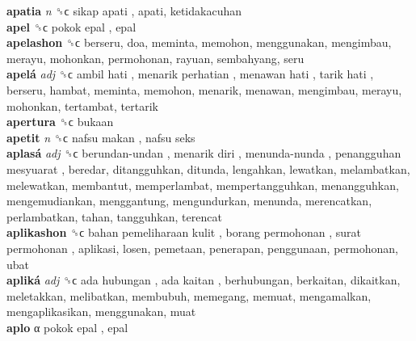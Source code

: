 \textbf{apatia} \emph{n}  ␝ϲ   sikap apati , apati, ketidakacuhan  \\
\textbf{apel} ␝ϲ   pokok epal , epal  \\
\textbf{apelashon} ␝ϲ  berseru, doa, meminta, memohon, menggunakan, mengimbau, merayu, mohonkan, permohonan, rayuan, sembahyang, seru  \\
\textbf{apelá} \emph{adj}  ␝ϲ   ambil hati ,  menarik perhatian ,  menawan hati ,  tarik hati , berseru, hambat, meminta, memohon, menarik, menawan, mengimbau, merayu, mohonkan, tertambat, tertarik  \\
\textbf{apertura} ␝ϲ  bukaan  \\
\textbf{apetit} \emph{n}  ␝ϲ   nafsu makan ,  nafsu seks   \\
\textbf{aplasá} \emph{adj}  ␝ϲ   berundan-undan ,  menarik diri ,  menunda-nunda ,  penangguhan mesyuarat , beredar, ditangguhkan, ditunda, lengahkan, lewatkan, melambatkan, melewatkan, membantut, memperlambat, mempertangguhkan, menangguhkan, mengemudiankan, menggantung, mengundurkan, menunda, merencatkan, perlambatkan, tahan, tangguhkan, terencat  \\
\textbf{aplikashon} ␝ϲ   bahan pemeliharaan kulit ,  borang permohonan ,  surat permohonan , aplikasi, losen, pemetaan, penerapan, penggunaan, permohonan, ubat  \\
\textbf{apliká} \emph{adj}  ␝ϲ   ada hubungan ,  ada kaitan , berhubungan, berkaitan, dikaitkan, meletakkan, melibatkan, membubuh, memegang, memuat, mengamalkan, mengaplikasikan, menggunakan, muat  \\
\textbf{aplo} α   pokok epal , epal  \\
